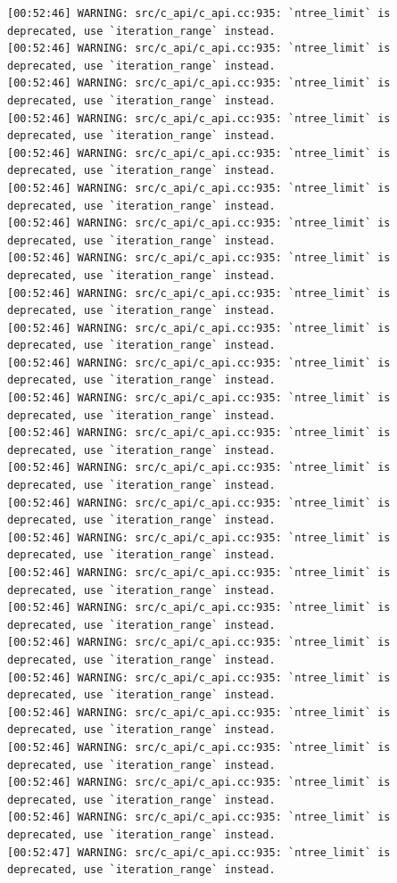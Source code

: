 \documentclass[
  letterpaper,
  DIV=11,
  numbers=noendperiod]{scrartcl}
\begin{document}
\begin{verbatim}
[00:52:46] WARNING: src/c_api/c_api.cc:935: `ntree_limit` is deprecated, use `iteration_range` instead.
[00:52:46] WARNING: src/c_api/c_api.cc:935: `ntree_limit` is deprecated, use `iteration_range` instead.
[00:52:46] WARNING: src/c_api/c_api.cc:935: `ntree_limit` is deprecated, use `iteration_range` instead.
[00:52:46] WARNING: src/c_api/c_api.cc:935: `ntree_limit` is deprecated, use `iteration_range` instead.
[00:52:46] WARNING: src/c_api/c_api.cc:935: `ntree_limit` is deprecated, use `iteration_range` instead.
[00:52:46] WARNING: src/c_api/c_api.cc:935: `ntree_limit` is deprecated, use `iteration_range` instead.
[00:52:46] WARNING: src/c_api/c_api.cc:935: `ntree_limit` is deprecated, use `iteration_range` instead.
[00:52:46] WARNING: src/c_api/c_api.cc:935: `ntree_limit` is deprecated, use `iteration_range` instead.
[00:52:46] WARNING: src/c_api/c_api.cc:935: `ntree_limit` is deprecated, use `iteration_range` instead.
[00:52:46] WARNING: src/c_api/c_api.cc:935: `ntree_limit` is deprecated, use `iteration_range` instead.
[00:52:46] WARNING: src/c_api/c_api.cc:935: `ntree_limit` is deprecated, use `iteration_range` instead.
[00:52:46] WARNING: src/c_api/c_api.cc:935: `ntree_limit` is deprecated, use `iteration_range` instead.
[00:52:46] WARNING: src/c_api/c_api.cc:935: `ntree_limit` is deprecated, use `iteration_range` instead.
[00:52:46] WARNING: src/c_api/c_api.cc:935: `ntree_limit` is deprecated, use `iteration_range` instead.
[00:52:46] WARNING: src/c_api/c_api.cc:935: `ntree_limit` is deprecated, use `iteration_range` instead.
[00:52:46] WARNING: src/c_api/c_api.cc:935: `ntree_limit` is deprecated, use `iteration_range` instead.
[00:52:46] WARNING: src/c_api/c_api.cc:935: `ntree_limit` is deprecated, use `iteration_range` instead.
[00:52:46] WARNING: src/c_api/c_api.cc:935: `ntree_limit` is deprecated, use `iteration_range` instead.
[00:52:46] WARNING: src/c_api/c_api.cc:935: `ntree_limit` is deprecated, use `iteration_range` instead.
[00:52:46] WARNING: src/c_api/c_api.cc:935: `ntree_limit` is deprecated, use `iteration_range` instead.
[00:52:46] WARNING: src/c_api/c_api.cc:935: `ntree_limit` is deprecated, use `iteration_range` instead.
[00:52:46] WARNING: src/c_api/c_api.cc:935: `ntree_limit` is deprecated, use `iteration_range` instead.
[00:52:46] WARNING: src/c_api/c_api.cc:935: `ntree_limit` is deprecated, use `iteration_range` instead.
[00:52:46] WARNING: src/c_api/c_api.cc:935: `ntree_limit` is deprecated, use `iteration_range` instead.
[00:52:47] WARNING: src/c_api/c_api.cc:935: `ntree_limit` is deprecated, use `iteration_range` instead.

\end{verbatim}
\end{document}
